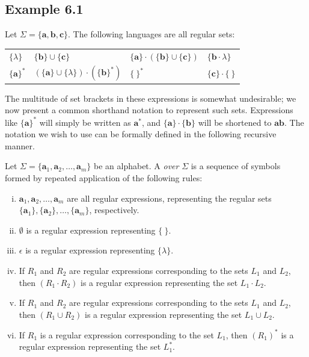 \subsection*{Example 6.1}

Let $\Sigma = \{\pmb{a},\pmb{b},\pmb{c}\}$. The following languages are all
regular sets:
\begin{center}\begin{tabular}{llll}
$\{\lambda\}$ & $\{\pmb{b}\}\cup\{\pmb{c}\}$ & $\{\pmb{a}\}\cdot(\{\pmb{b}\}\cup
	\{\pmb{c}\})$ & $\{\pmb{b}\cdot\lambda\}$ \\
$\{\pmb{a}\}^*$ & $(\{\pmb{a}\}\cup\{\lambda\})\cdot(\{\pmb{b}\}^*)$ & $\{\ \}^*$
	& $\{\pmb{c}\}\cdot\{\ \}$
\end{tabular}\end{center}

The multitude of set brackets in these expressions is somewhat undesirable;
we now present a common shorthand notation to represent such sets. Expressions
like $\{\pmb{a}\}^*$ will simply be written as $\pmb{a}^*$, and $\{\pmb{a}\}
\cdot \{\pmb{b}\}$ will be shortened to $\pmb{ab}$. The notation we wish to use
can be formally defined in the following recursive manner.

\begin{dfn}\label{dfn-6.2}
Let $\Sigma=\{\pmb{a}_1,\pmb{a}_2, \ldots ,\pmb{a}_m\}$ be an alphabet. A
\emph{ over} $\Sigma$ is a sequence of symbols formed
by repeated application of the following rules:
\begin{enumerate}[i.]
\item $\pmb{a}_1,\pmb{a}_2, \ldots ,\pmb{a}_m$ are all regular expressions,
	representing the regular sets $\{\pmb{a}_1\},\{\pmb{a}_2\}, \ldots ,
	\{\pmb{a}_m\}$, respectively.
\item $\emptyset$ is a regular expression representing $\{\ \}$.
\item $\epsilon$ is a regular expression representing $\{\lambda\}$.
\item If $R_1$ and $R_2$ are regular expressions corresponding to the sets $L_1$
	and $L_2$, then $(R_1 \cdot R_2)$ is a regular expression representing
	the set $L_1 \cdot L_2$.
\item If $R_1$ and $R_2$ are regular expressions corresponding to the sets $L_1$
	and $L_2$, then $(R_1 \cup R_2)$ is a regular expression representing
	the set $L_1 \cup L_2$.
\item If $R_1$ is a regular expression corresponding to the set $L_1$, then
	$(R_1)^*$ is a regular expression representing the set $L_1^*$.
\end{enumerate}
\end{dfn}

